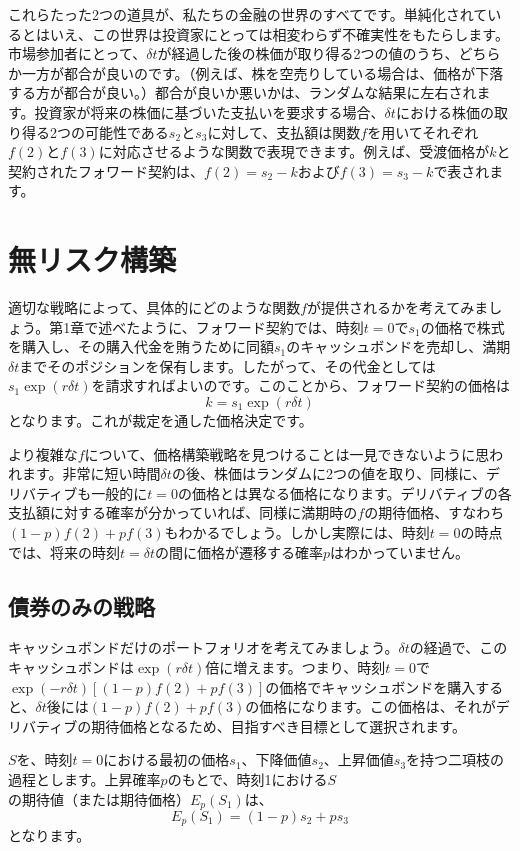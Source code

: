\documentclass[uplatex,a4j,12pt,dvipdfmx]{jsarticle}
\begin{document}
これらたった2つの道具が、私たちの金融の世界のすべてです。単純化されているとはいえ、この世界は投資家にとっては相変わらず不確実性をもたらします。市場参加者にとって、$\delta t$が経過した後の株価が取り得る2つの値のうち、どちらか一方が都合が良いのです。（例えば、株を空売りしている場合は、価格が下落する方が都合が良い。）都合が良いか悪いかは、ランダムな結果に左右されます。投資家が将来の株価に基づいた支払いを要求する場合、$\delta t$における株価の取り得る2つの可能性である$s_2$と$s_3$に対して、支払額は関数$f$を用いてそれぞれ$f(2)$と$f(3)$に対応させるような関数で表現できます。例えば、受渡価格が$k$と契約されたフォワード契約は、$f(2)=s_2-k$および$f(3)=s_3-k$で表されます。

\section{無リスク構築}
適切な戦略によって、具体的にどのような関数$f$が提供されるかを考えてみましょう。第1章で述べたように、フォワード契約では、時刻$t=0$で$s_1$の価格で株式を購入し、その購入代金を賄うために同額$s_1$のキャッシュボンドを売却し、満期$\delta t$までそのポジションを保有します。したがって、その代金としては$s_1 \exp(r\delta t)$を請求すればよいのです。このことから、フォワード契約の価格は\[k = s_1 \exp(r\delta t)\]となります。これが裁定を通した価格決定です。

より複雑な$f$について、価格構築戦略を見つけることは一見できないように思われます。非常に短い時間$\delta t$の後、株価はランダムに2つの値を取り、同様に、デリバティブも一般的に$t=0$の価格とは異なる価格になります。デリバティブの各支払額に対する確率が分かっていれば、同様に満期時の$f$の期待価格、すなわち$(1-p)f(2) + pf(3)$もわかるでしょう。しかし実際には、時刻$t=0$の時点では、将来の時刻$t=\delta t$の間に価格が遷移する確率$p$はわかっていません。

\subsection{債券のみの戦略}
キャッシュボンドだけのポートフォリオを考えてみましょう。$\delta t$の経過で、このキャッシュボンドは$\exp(r\delta t)$倍に増えます。つまり、時刻$t=0$で$\exp(-r\delta t)[(1-p)f(2) + pf(3)]$の価格でキャッシュボンドを購入すると、$\delta t$後には$(1-p)f(2) + pf(3)$の価格になります。この価格は、それがデリバティブの期待価格となるため、目指すべき目標として選択されます。

$S$を、時刻$t=0$における最初の価格$s_1$、下降価値$s_2$、上昇価値$s_3$を持つ二項枝の過程とします。上昇確率$p$のもとで、時刻1における$S$の期待値（または期待価格）$E_p(S_1)$は、\[E_p(S_1) = (1-p)s_2 + ps_3\]となります。
\end{document}
